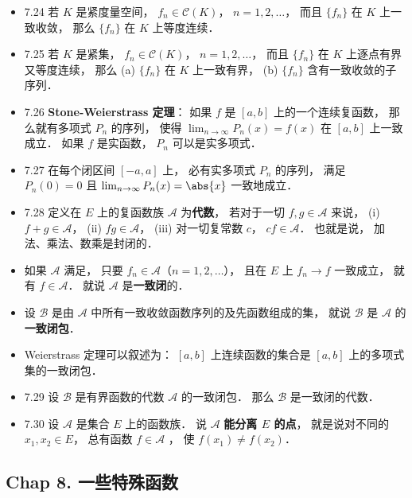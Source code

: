 \begin{itemize}
\item 7.24 若 $K$ 是紧度量空间， $f_n\in \mathscr C(K)$， $n=1,2,\dots$， 而且 $\{f_n\}$ 在 $K$ 上一致收敛， 那么 $\{f_n\}$ 在 $K$ 上等度连续．

\item 7.25 若 $K$ 是紧集， $f_n\in \mathscr C(K)$， $n=1,2,\dots$， 而且 $\{f_n\}$ 在 $K$ 上逐点有界又等度连续， 那么 (a) $\{f_n\}$ 在 $K$ 上一致有界， (b) $\{f_n\}$ 含有一致收敛的子序列．

\item 7.26 \textbf{Stone-Weierstrass 定理}： 如果 $f$ 是 $[a,b]$ 上的一个连续复函数， 那么就有多项式 $P_n$ 的序列， 使得 $\lim_{n\to\infty} P_n(x) = f(x)$ 在 $[a,b]$ 上一致成立． 如果 $f$ 是实函数， $P_n$ 可以是实多项式．

\item 7.27 在每个闭区间 $[-a,a]$ 上， 必有实多项式 $P_n$ 的序列， 满足 $P_n(0) = 0$ 且 $\lim_{n\to\infty} P_n(x) = \abs{x}$ 一致地成立．

\item 7.28 定义在 $E$ 上的复函数族 $\mathscr A$ 为\textbf{代数}， 若对于一切 $f,g\in \mathscr A$ 来说， (i) $f+g\in \mathscr A$， (ii) $fg\in \mathscr A$， (iii) 对一切复常数 $c$， $cf\in \mathscr A$． 也就是说， 加法、乘法、数乘是封闭的．

\item 如果 $\mathscr A$ 满足， 只要 $f_n\in \mathscr A$（$n=1,2,\dots$）， 且在 $E$ 上 $f_n\to f$ 一致成立， 就有 $f\in \mathscr A$． 就说 $\mathscr A$ 是\textbf{一致闭}的．

\item 设 $\mathscr B$ 是由 $\mathscr A$ 中所有一致收敛函数序列的及先函数组成的集， 就说 $\mathscr B$ 是 $\mathscr A$ 的\textbf{一致闭包}．

\item Weierstrass 定理可以叙述为： $[a,b]$ 上连续函数的集合是 $[a,b]$ 上的多项式集的一致闭包．

\item 7.29 设 $\mathscr B$ 是有界函数的代数 $\mathscr A$ 的一致闭包． 那么 $\mathscr B$ 是一致闭的代数．

\item 7.30 设 $\mathscr A$ 是集合 $E$ 上的函数族． 说 $\mathscr A$ \textbf{能分离 $E$ 的点}， 就是说对不同的 $x_1,x_2\in E$， 总有函数 $f\in \mathscr A$ ， 使 $f(x_1)\ne f(x_2)$．
\end{itemize}


\subsection{Chap 8. 一些特殊函数}

